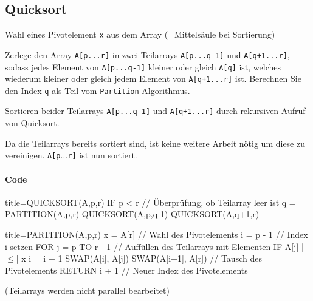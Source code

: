 \documentclass[
    ngerman,
    color=3b,
    dark_mode,
    load_common, %
    summary,
    boxarc,
]{rubos-tuda-template}
\begin{document}
\clearpage
\subsection{Quicksort}\label{Quicksort}
\begin{idea}[Quicksort]\mbox{}
    \begin{description}[leftmargin=2.5cm,itemsep=1em]
        \item [Pivotelement]
              Wahl eines Pivotelement \texttt{x} aus dem Array (=Mittelsäule bei Sortierung)
        \item [Divide]
              Zerlege den Array \texttt{A[p...r]} in zwei Teilarrays \texttt{A[p...q-1]} und \texttt{A[q+1...r]},
              sodass jedes Element von \texttt{A[p...q-1]} kleiner oder gleich \texttt{A[q]} ist, welches
              wiederum kleiner oder gleich jedem Element von \texttt{A[q+1...r]} ist. Berechnen Sie den Index \texttt{q}
              als Teil vom \texttt{Partition} Algorithmus.
        \item [Conquer]
              Sortieren beider Teilarrays \texttt{A[p...q-1]} und \texttt{A[q+1...r]} durch rekursiven Aufruf von
              Quicksort.
        \item [Combine]
              Da die Teilarrays bereits sortiert sind, ist keine weitere Arbeit nötig um diese zu vereinigen.
              \texttt{A[p$\ldots$r]} ist nun sortiert.
    \end{description}

\end{idea}

\paragraph{Code}\mbox{}
          \begin{codeBlock}[autogobble,escapeinside=||]{title={QUICKSORT(A,p,r)}}
              IF p < r    // Überprüfung, ob Teilarray leer ist
                q = PARTITION(A,p,r)
                QUICKSORT(A,p,q-1)
                QUICKSORT(A,q+1,r)
          \end{codeBlock}
          \begin{codeBlock}[autogobble,escapeinside=||]{title={PARTITION(A,p,r)}}
              x = A[r]    // Wahl des Pivotelements
              i = p - 1   // Index i setzen
              FOR j = p TO r - 1 // Auffüllen des Teilarrays mit Elementen
                IF A[j] |$\leq$| x
                    i = i + 1
                    SWAP(A[i], A[j])
              SWAP(A[i+1], A[r]) // Tausch des Pivotelements
              RETURN i + 1 // Neuer Index des Pivotelements
          \end{codeBlock}
(Teilarrays werden nicht parallel bearbeitet)
\clearpage
\end{document}
